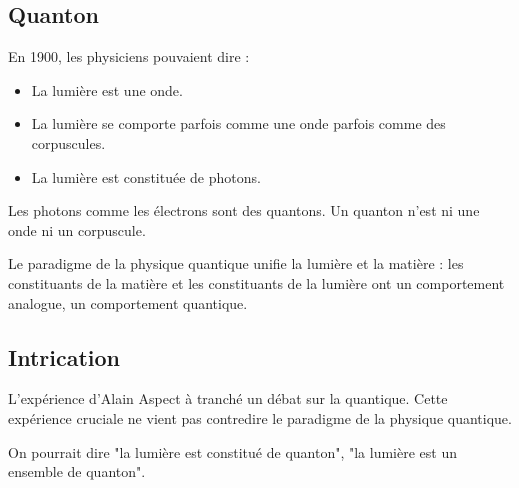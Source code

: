 \subsection{Quanton}

En 1900, les physiciens pouvaient dire : 

\begin{itemize}[leftmargin=1cm, label=, itemsep=3pt]
\item La lumière est une onde.
\item La lumière se comporte parfois comme une onde parfois comme des corpuscules.
\item La lumière est constituée de photons.
\end{itemize}

Les photons comme les électrons sont des quantons. Un quanton n'est ni une onde ni un corpuscule.

Le paradigme de la physique quantique unifie la lumière et la matière : les constituants de la matière et les constituants de la lumière ont un comportement analogue, un comportement quantique.

\subsection{Intrication}
L'expérience d'Alain Aspect à tranché un débat sur la quantique. Cette expérience cruciale ne vient pas contredire le paradigme de la physique quantique.


On pourrait dire "la lumière est constitué de quanton", "la lumière est un ensemble de quanton".
\subsection{}
\begin{center}
\end{center}

